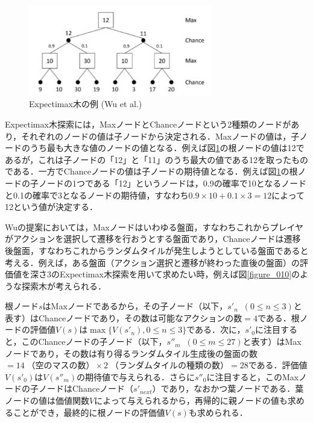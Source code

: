 \documentclass{suribt}
\begin{document}
\begin{figure}[t]
	\begin{center}
	\includegraphics[width=8cm]{figure_003.png}
	\caption{Expectimax木の例 (Wu et al.)}
	\label{figure_003}
	\end{center}
\end{figure}

Expectimax木探索には，MaxノードとChanceノードという2種類のノードがあり，それぞれのノードの値は子ノードから決定される．Maxノードの値は，子ノードのうち最も大きな値のノードの値となる．例えば図\ref{figure_003}の根ノードの値は12であるが，これは子ノードの「12」と「11」のうち最大の値である12を取ったものである．一方でChanceノードの値は子ノードの期待値となる．例えば図\ref{figure_003}の根ノードの子ノードの1つである「12」というノードは，0.9の確率で10となるノードと0.1の確率で3となるノードの期待値，すなわち$0.9 \times 10 + 0.1 \times 3 = 12$によって12という値が決定する．

Wuの提案においては，Maxノードはいわゆる盤面，すなわちこれからプレイヤがアクションを選択して遷移を行おうとする盤面であり，Chanceノードは遷移後盤面，すなわちこれからランダムタイルが発生しようとしている盤面であると考える．例えば，ある盤面（アクション選択と遷移が終わった直後の盤面）の評価値を深さ3のExpectimax木探索を用いて求めたい時，例えば図\ref{figure_010}のような探索木が考えられる．

根ノード$s$はMaxノードであるから，その子ノード（以下，$s'_n \;\; (0 \leq n \leq 3)$と表す）はChanceノードであり，その数は可能なアクションの数$=4$である．根ノードの評価値$V(s)$は$\max\{V(s'_n), 0 \leq n \leq 3\}$である．次に，$s'_0$に注目すると，このChanceノードの子ノード（以下，$s''_m \;\; (0 \leq m \leq 27)$と表す）はMaxノードであり，その数は有り得るランダムタイル生成後の盤面の数$=14 \; \text{（空のマスの数）} \times 2 \; \text{（ランダムタイルの種類の数）} = 28$である．評価値$V(s'_0)$は$V(s''_m)$の期待値で与えられる．さらに$s''_0$に注目すると，このMaxノードの子ノードはChanceノード（$s'_{next}$）であり，なおかつ葉ノードである．葉ノードの値は価値関数$V$によって与えられるから，再帰的に親ノードの値も求めることができ，最終的に根ノードの評価値$V(s)$も求められる．
\end{document}
